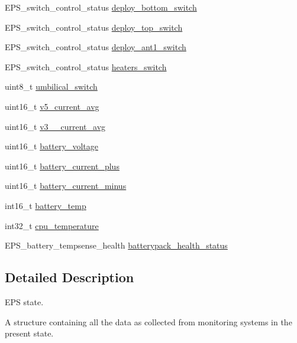 \begin{DoxyCompactItemize}
\item 
E\-P\-S\-\_\-switch\-\_\-control\-\_\-status \hyperlink{struct_e_p_s___state_a976cd905087c155dc203cc811d4d6e42}{deploy\-\_\-bottom\-\_\-switch}
\item 
E\-P\-S\-\_\-switch\-\_\-control\-\_\-status \hyperlink{struct_e_p_s___state_a15d3738512c5160058576a9181727094}{deploy\-\_\-top\-\_\-switch}
\item 
E\-P\-S\-\_\-switch\-\_\-control\-\_\-status \hyperlink{struct_e_p_s___state_a4907eec642bf2671de8e9a47b7d21a6e}{deploy\-\_\-ant1\-\_\-switch}
\item 
E\-P\-S\-\_\-switch\-\_\-control\-\_\-status \hyperlink{struct_e_p_s___state_a6b22df97afb9a109a08b31cb317daa12}{heaters\-\_\-switch}
\item 
uint8\-\_\-t \hyperlink{struct_e_p_s___state_a87847b892dfaad1873366d7b80921ba5}{umbilical\-\_\-switch}
\item 
uint16\-\_\-t \hyperlink{struct_e_p_s___state_a732d523021005336fdd18ff961475bac}{v5\-\_\-current\-\_\-avg}
\item 
uint16\-\_\-t \hyperlink{struct_e_p_s___state_a56c6787cc19c48659400ea2ed1f71c15}{v3\-\_\-\_\-current\-\_\-avg}
\item 
uint16\-\_\-t \hyperlink{struct_e_p_s___state_a991b8e87396c3a76e3920115c165cf21}{battery\-\_\-voltage}
\item 
uint16\-\_\-t \hyperlink{struct_e_p_s___state_aa252bb52b29b61764a4922003a6f2f10}{battery\-\_\-current\-\_\-plus}
\item 
uint16\-\_\-t \hyperlink{struct_e_p_s___state_ad3b15bd99dc275cedebc984e63fd1838}{battery\-\_\-current\-\_\-minus}
\item 
int16\-\_\-t \hyperlink{struct_e_p_s___state_a4df91df2e72e6b2a80770a699f329781}{battery\-\_\-temp}
\item 
int32\-\_\-t \hyperlink{struct_e_p_s___state_a2f7dfc508a66740a64a25fda4dd8a503}{cpu\-\_\-temperature}
\item 
E\-P\-S\-\_\-battery\-\_\-tempsense\-\_\-health \hyperlink{struct_e_p_s___state_a8b34854a3d12dc7e7c705feb0074de76}{batterypack\-\_\-health\-\_\-status}
\end{DoxyCompactItemize}


\subsection{Detailed Description}
E\-P\-S state. 

A structure containing all the data as collected from monitoring systems in the present state. 

